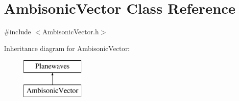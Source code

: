 \hypertarget{class_ambisonic_vector}{\section{Ambisonic\-Vector Class Reference}
\label{class_ambisonic_vector}
}


{\ttfamily \#include $<$Ambisonic\-Vector.\-h$>$}

Inheritance diagram for Ambisonic\-Vector\-:\begin{figure}[H]
\begin{center}
\leavevmode
\includegraphics[height=2.000000cm]{class_ambisonic_vector}
\end{center}
\end{figure}
